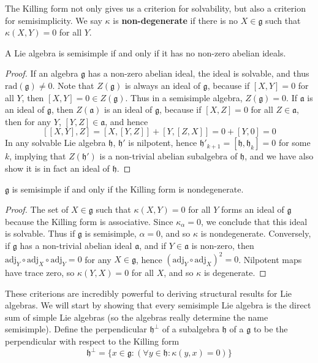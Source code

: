 The Killing form not only gives us a criterion for solvability, but also a criterion for semisimplicity. We say $\kappa$ is {\bf non-degenerate} if there is no $X \in \mathfrak{g}$ such that $\kappa(X,Y) = 0$ for all $Y$.

\begin{lemma}
    A Lie algebra is semisimple if and only if it has no non-zero abelian ideals.
\end{lemma}
\begin{proof}
    If an algebra $\mathfrak{g}$ has a non-zero abelian ideal, the ideal is solvable, and thus $\text{rad}(\mathfrak{g}) \neq 0$. Note that $Z(\mathfrak{g})$ is always an ideal of $\mathfrak{g}$, because if $[X,Y] = 0$ for all $Y$, then $[X,Y] = 0 \in Z(\mathfrak{g})$. Thus in a semisimple algebra, $Z(\mathfrak{g}) = 0$. If $\mathfrak{a}$ is an ideal of $\mathfrak{g}$, then $Z(\mathfrak{a})$ is an ideal of $\mathfrak{g}$, because if $[X,Z] = 0$ for all $Z \in \mathfrak{a}$, then for any $Y$, $[Y,Z] \in \mathfrak{a}$, and hence
    \[ [[X,Y],Z] = [X,[Y,Z]] + [Y,[Z,X]] = 0 + [Y,0] = 0 \]
    In any solvable Lie algebra $\mathfrak{h}$, $\mathfrak{h}'$ is nilpotent, hence $\mathfrak{h}'_{k+1} = [\mathfrak{h}, \mathfrak{h}_k] = 0$ for some $k$, implying that $Z(\mathfrak{h}')$ is a non-trivial abelian subalgebra of $\mathfrak{h}$, and we have also show it is in fact an ideal of $\mathfrak{h}$.
\end{proof}

\begin{theorem}
    $\mathfrak{g}$ is semisimple if and only if the Killing form is nondegenerate.
\end{theorem}
\begin{proof}
    The set of $X \in \mathfrak{g}$ such that $\kappa(X,Y) = 0$ for all $Y$ forms an ideal of $\mathfrak{g}$ because the Killing form is associative. Since $\kappa_\alpha = 0$, we conclude that this ideal is solvable. Thus if $\mathfrak{g}$ is semisimple, $\alpha = 0$, and so $\kappa$ is nondegenerate. Conversely, if $\mathfrak{g}$ has a non-trivial abelian ideal $\mathfrak{a}$, and if $Y \in \mathfrak{a}$ is non-zero, then $\text{adj}_Y \circ \text{adj}_X \circ \text{adj}_Y = 0$ for any $X \in \mathfrak{g}$, hence $(\text{adj}_Y \circ \text{adj}_X)^2 = 0$. Nilpotent maps have trace zero, so $\kappa(Y,X) = 0$ for all $X$, and so $\kappa$ is degenerate.
\end{proof}

These criterions are incredibly powerful to deriving structural results for Lie algebras. We will start by showing that every semisimple Lie algebra is the direct sum of simple Lie algebras (so the algebras really determine the name semisimple). Define the perpendicular $\mathfrak{h}^\perp$ of a subalgebra $\mathfrak{h}$ of a $\mathfrak{g}$ to be the perpendicular with respect to the Killing form
%
\[ \mathfrak{h}^\perp = \{ x \in \mathfrak{g} : (\forall y \in \mathfrak{h}: \kappa(y,x) = 0) \} \]

